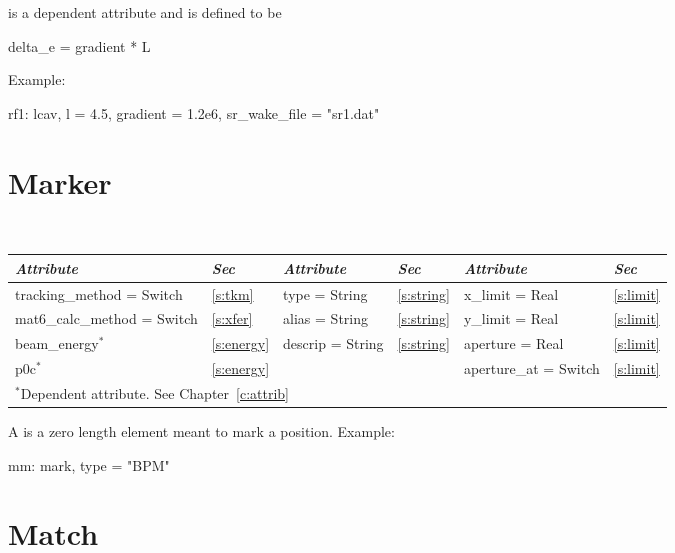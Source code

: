 {{ is a dependent attribute and is
defined to be
\begin{example}
  delta_e = gradient * L
\end{example}

Example:
\begin{example}
  rf1: lcav, l = 4.5, gradient = 1.2e6, sr\_wake\_file = "sr1.dat"
\end{example}

\section{Marker}
\label{s:mark}

\begin{center}
\tt
\begin{tabular}{|l|l||l|l||l|l|} \hline
  {\sl Attribute} & {\sl Sec}  & {\sl Attribute} & {\sl Sec} & {\sl Attribute} & {\sl Sec} \\ \hline
  tracking\_method = Switch    & \ref{s:tkm}   &  type = String      & \ref{s:string} & x\_limit = Real       & \ref{s:limit} \\ \hline 
  mat6\_calc\_method = Switch  & \ref{s:xfer}  &  alias = String     & \ref{s:string} & y\_limit = Real       & \ref{s:limit} \\ \hline 
  beam\_energy$^*$             & \ref{s:energy}&  descrip = String   & \ref{s:string} & aperture = Real       & \ref{s:limit} \\ \hline 
  p0c$^*$                      & \ref{s:energy}&                     &                & aperture\_at = Switch & \ref{s:limit} \\ \hline
  \multicolumn{6}{l}{\small $^*$Dependent attribute. See Chapter~\ref{c:attrib}} \\
\end{tabular}
\end{center}
\toffset

A  is a zero length element meant to mark a position.
Example:
\begin{example}
  mm: mark, type = "BPM"
\end{example}

\section{Match}
\label{s:match}

}}
